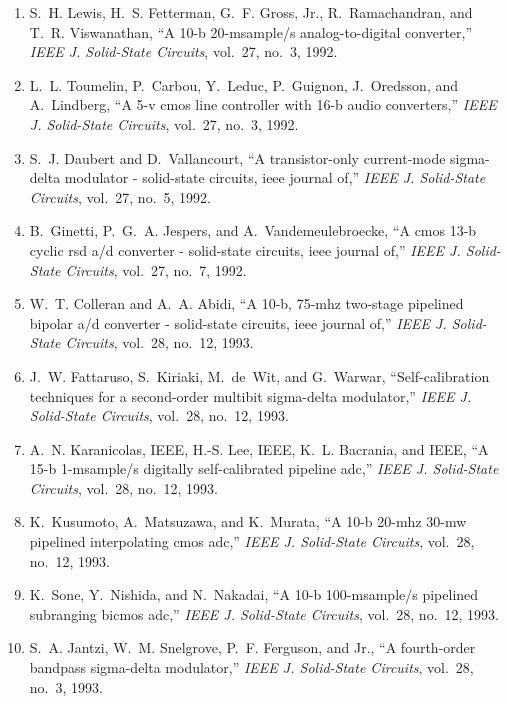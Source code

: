 \begin{enumerate}
\item
S.~H. Lewis, H.~S. Fetterman, G.~F. Gross, Jr., R.~Ramachandran, and T.~R.
  Viswanathan, ``A 10-b 20-msample/s analog-to-digital converter,''
  \emph{{IEEE} J. Solid-State Circuits}, vol.~27, no.~3, 1992.

\item
L.~L. Toumelin, P.~Carbou, Y.~Leduc, P.~Guignon, J.~Oredsson, and A.~Lindberg,
  ``A 5-v cmos line controller with 16-b audio converters,'' \emph{{IEEE} J.
  Solid-State Circuits}, vol.~27, no.~3, 1992.

\item
S.~J. Daubert and D.~Vallancourt, ``A transistor-only current-mode sigma-delta
  modulator - solid-state circuits, ieee journal of,'' \emph{{IEEE} J.
  Solid-State Circuits}, vol.~27, no.~5, 1992.

\item
B.~Ginetti, P.~G.~A. Jespers, and A.~Vandemeulebroecke, ``A cmos 13-b cyclic
  rsd a/d converter - solid-state circuits, ieee journal of,'' \emph{{IEEE} J.
  Solid-State Circuits}, vol.~27, no.~7, 1992.

\item
W.~T. Colleran and A.~A. Abidi, ``A 10-b, 75-mhz two-stage pipelined bipolar
  a/d converter - solid-state circuits, ieee journal of,'' \emph{{IEEE} J.
  Solid-State Circuits}, vol.~28, no.~12, 1993.

\item
J.~W. Fattaruso, S.~Kiriaki, M.~de~Wit, and G.~Warwar, ``Self-calibration
  techniques for a second-order multibit sigma-delta modulator,'' \emph{{IEEE}
  J. Solid-State Circuits}, vol.~28, no.~12, 1993.

\item
A.~N. Karanicolas, IEEE, H.-S. Lee, IEEE, K.~L. Bacrania, and IEEE, ``A 15-b
  1-msample/s digitally self-calibrated pipeline adc,'' \emph{{IEEE} J.
  Solid-State Circuits}, vol.~28, no.~12, 1993.

\item
K.~Kusumoto, A.~Matsuzawa, and K.~Murata, ``A 10-b 20-mhz 30-mw pipelined
  interpolating cmos adc,'' \emph{{IEEE} J. Solid-State Circuits}, vol.~28,
  no.~12, 1993.

\item
K.~Sone, Y.~Nishida, and N.~Nakadai, ``A 10-b 100-msample/s pipelined
  subranging bicmos adc,'' \emph{{IEEE} J. Solid-State Circuits}, vol.~28,
  no.~12, 1993.

\item
S.~A. Jantzi, W.~M. Snelgrove, P.~F. Ferguson, and Jr., ``A fourth-order
  bandpass sigma-delta modulator,'' \emph{{IEEE} J. Solid-State Circuits},
  vol.~28, no.~3, 1993.


\end{enumerate}
